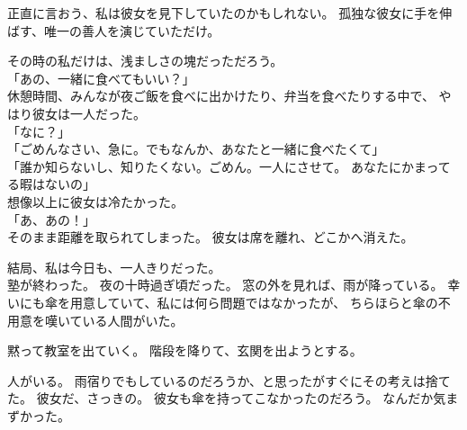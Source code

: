 \documentclass[../IHMain]{subfiles}
\begin{document}
正直に言おう、私は彼女を見下していたのかもしれない。
孤独な彼女に手を伸ばす、唯一の善人を演じていただけ。

その時の私だけは、浅ましさの塊だっただろう。\\
「あの、一緒に食べてもいい？」\\
休憩時間、みんなが夜ご飯を食べに出かけたり、弁当を食べたりする中で、
やはり彼女は一人だった。\\
「なに？」\\
「ごめんなさい、急に。でもなんか、あなたと一緒に食べたくて」\\
「誰か知らないし、知りたくない。ごめん。一人にさせて。
あなたにかまってる暇はないの」\\
想像以上に彼女は冷たかった。\\
「あ、あの！」\\
そのまま距離を取られてしまった。
彼女は席を離れ、どこかへ消えた。

結局、私は今日も、一人きりだった。\\

塾が終わった。
夜の十時過ぎ頃だった。
窓の外を見れば、雨が降っている。
幸いにも傘を用意していて、私には何ら問題ではなかったが、
ちらほらと傘の不用意を嘆いている人間がいた。

黙って教室を出ていく。
階段を降りて、玄関を出ようとする。

人がいる。
雨宿りでもしているのだろうか、と思ったがすぐにその考えは捨てた。
彼女だ、さっきの。
彼女も傘を持ってこなかったのだろう。
なんだか気まずかった。
\end{document}
